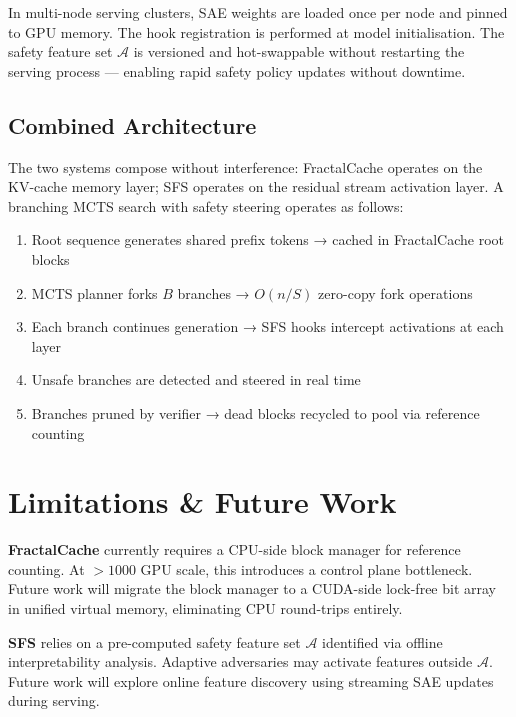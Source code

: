 \documentclass[10pt,twocolumn]{article}
\begin{document}
In multi-node serving clusters, SAE weights are loaded once per node and pinned to GPU memory. The hook registration is performed at model initialisation. The safety feature set $\mathcal{A}$ is versioned and hot-swappable without restarting the serving process — enabling rapid safety policy updates without downtime.

\subsection{Combined Architecture}

The two systems compose without interference: FractalCache operates on the KV-cache memory layer; SFS operates on the residual stream activation layer. A branching MCTS search with safety steering operates as follows:

\begin{enumerate}[leftmargin=*]
    \item Root sequence generates shared prefix tokens → cached in FractalCache root blocks
    \item MCTS planner forks $B$ branches → $O(n/S)$ zero-copy fork operations
    \item Each branch continues generation → SFS hooks intercept activations at each layer
    \item Unsafe branches are detected and steered in real time
    \item Branches pruned by verifier → dead blocks recycled to pool via reference counting
\end{enumerate}

\section{Limitations \& Future Work}

\textbf{FractalCache} currently requires a CPU-side block manager for reference counting. At $>1000$ GPU scale, this introduces a control plane bottleneck. Future work will migrate the block manager to a CUDA-side lock-free bit array in unified virtual memory, eliminating CPU round-trips entirely.

\textbf{SFS} relies on a pre-computed safety feature set $\mathcal{A}$ identified via offline interpretability analysis. Adaptive adversaries may activate features outside $\mathcal{A}$. Future work will explore online feature discovery using streaming SAE updates during serving.
\end{document}
